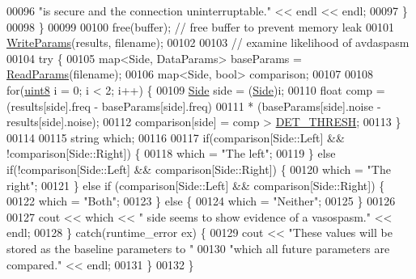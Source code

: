\begin{DoxyCode}
00096                 \textcolor{stringliteral}{"is secure and the connection uninterruptable."} << endl << endl;
00097         \}
00098     \}
00099 
00100     free(buffer);  \textcolor{comment}{// free buffer to prevent memory leak}
00101     \hyperlink{namespaceavda_a1e3f5a0eb4ee9a7010d57dc38bd8dfec}{WriteParams}(results, filename);
00102 
00103     \textcolor{comment}{// examine likelihood of avdaspasm}
00104     \textcolor{keywordflow}{try} \{
00105         map<Side, DataParams> baseParams = \hyperlink{namespaceavda_a46dc980b65ddfc24749ce25c1290e158}{ReadParams}(filename);
00106         map<Side, bool> comparison;
00107 
00108         \textcolor{keywordflow}{for}(\hyperlink{definitions_8hpp_adde6aaee8457bee49c2a92621fe22b79}{uint8} i = 0; i < 2; i++) \{
00109             \hyperlink{namespaceavda_af723e82f0d3d45fda6fdc01f6a492786}{Side} side = (\hyperlink{namespaceavda_af723e82f0d3d45fda6fdc01f6a492786}{Side})i;
00110             \textcolor{keywordtype}{float} comp = (results[side].freq - baseParams[side].freq) 
00111                 * (baseParams[side].noise - results[side].noise);
00112             comparison[side] = comp > \hyperlink{definitions_8hpp_aa15adfcc96559f1b86210d217edd3afc}{DET\_THRESH};
00113         \}
00114 
00115         \textcolor{keywordtype}{string} which;
00116 
00117         \textcolor{keywordflow}{if}(comparison[Side::Left] && !comparison[Side::Right]) \{
00118             which = \textcolor{stringliteral}{"The left"};
00119         \} \textcolor{keywordflow}{else} \textcolor{keywordflow}{if}(!comparison[Side::Left] && comparison[Side::Right]) \{
00120             which = \textcolor{stringliteral}{"The right"};
00121         \} \textcolor{keywordflow}{else} \textcolor{keywordflow}{if} (comparison[Side::Left] && comparison[Side::Right]) \{
00122             which = \textcolor{stringliteral}{"Both"};
00123         \} \textcolor{keywordflow}{else} \{
00124             which = \textcolor{stringliteral}{"Neither"};
00125         \}
00126 
00127         cout << which << \textcolor{stringliteral}{" side seems to show evidence of a vasospasm."} << endl;
00128     \} \textcolor{keywordflow}{catch}(runtime\_error ex) \{
00129         cout << \textcolor{stringliteral}{"These values will be stored as the baseline parameters to "}
00130             \textcolor{stringliteral}{"which all future parameters are compared."} << endl;
00131     \}
00132 \}
\end{DoxyCode}

